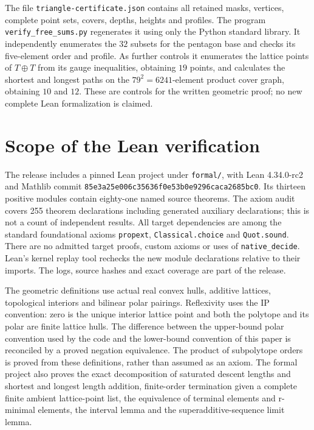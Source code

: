 \documentclass[manuscript]{aomart}
\theoremstyle{definition}
\theoremstyle{remark}
\begin{document}
The file \texttt{triangle-certificate.json} contains all retained masks,
vertices, complete point sets, covers, depths, heights and profiles.
The program \texttt{verify\_free\_sums.py} regenerates it using only the
Python standard library. It independently enumerates the $32$ subsets
for the pentagon base and checks its five-element order and profile.
As further controls it enumerates the lattice points of $T\oplus T$
from its gauge inequalities, obtaining $19$ points, and calculates the
shortest and longest paths on the $79^2=6241$-element product cover
graph, obtaining $10$ and $12$. These are controls for the written
geometric proof; no new complete Lean formalization is claimed.


\section{Scope of the Lean verification}\label{app:formal}
The release includes a pinned Lean project under
\texttt{formal/}, with Lean 4.34.0-rc2 and Mathlib commit
\texttt{85e3a25e006c35636f0e53b0e9296caca2685bc0}.
Its thirteen positive modules contain eighty-one named source theorems.
The axiom audit covers 255 theorem declarations including generated
auxiliary declarations; this is not a count of independent results.
All target dependencies are among the standard foundational axioms
\texttt{propext}, \texttt{Classical.choice} and \texttt{Quot.sound}.
There are no admitted target proofs, custom axioms or uses of
\texttt{native\_decide}. Lean's kernel replay tool rechecks the new
module declarations relative to their imports. The logs, source hashes
and exact coverage are part of the release.

The geometric definitions use actual real convex hulls, additive
lattices, topological interiors and bilinear polar pairings. Reflexivity
uses the IP convention: zero is the unique interior lattice point and
both the polytope and its polar are finite lattice hulls.
The difference between the upper-bound polar convention used by the
code and the lower-bound convention of this paper is reconciled by
a proved negation equivalence. The product of subpolytope orders is
proved from these definitions, rather than assumed as an axiom.
The formal project also proves the exact decomposition of saturated
descent lengths and shortest and longest length addition, finite-order
termination given a complete finite ambient lattice-point list, the
equivalence of terminal elements and r-minimal elements, the interval
lemma and the superadditive-sequence limit lemma.
\end{document}
